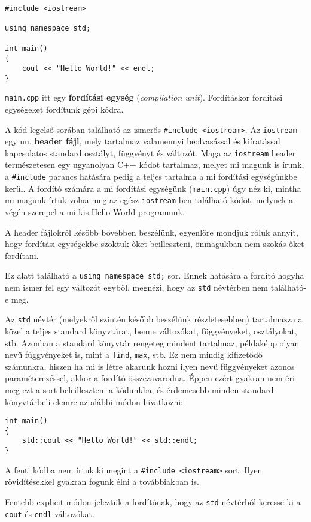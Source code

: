 \documentclass[a4paper,11.5pt,table]{article}
\begin{document}
	\medskip
	
	\begin{lstlisting}
#include <iostream>

using namespace std;
	
int main()
{
	cout << "Hello World!" << endl;
}
	\end{lstlisting}
	\texttt{main.cpp} itt egy \textbf{fordítási egység} (\textit{compilation unit}). Fordításkor fordítási egységeket fordítunk gépi kódra.
	
	A kód legelső sorában található az ismerős \texttt{\#include <iostream>}. Az \texttt{iostream} egy un. \textbf{header fájl}, mely tartalmaz valamennyi beolvasással és kiíratással kapcsolatos standard osztályt, függvényt és változót. Maga az \texttt{iostream} header természetesen egy ugyanolyan C++ kódot tartalmaz, melyet mi magunk is írunk, a \texttt{\#include} parancs hatására pedig a teljes tartalma a mi fordítási egységünkbe kerül. A fordító számára a mi fordítási egységünk (\texttt{main.cpp}) úgy néz ki, mintha mi magunk írtuk volna meg az egész \texttt{iostream}-ben található kódot, melynek a végén szerepel a mi kis Hello World programunk.
	
	A header fájlokról később bővebben beszélünk, egyenlőre mondjuk róluk annyit, hogy fordítási egységekbe szoktuk őket beilleszteni, önmagukban nem szokás őket fordítani.
	
	\medskip
	Ez alatt található a \texttt{using namespace std;} sor. Ennek hatására a fordító hogyha nem ismer fel egy változót egyből, megnézi, hogy az \texttt{std} névtérben nem található-e meg. 
	
	Az \texttt{std} névtér (melyekről szintén később beszélünk részletesebben) tartalmazza a közel a teljes standard könyvtárat, benne változókat, függvényeket, osztályokat, stb. Azonban a standard könyvtár rengeteg mindent tartalmaz, példaképp olyan nevű függvényeket is, mint a \texttt{find}, \texttt{max}, stb. Ez nem mindig kifizetődő számunkra, hiszen ha mi is létre akarunk hozni ilyen nevű függvényeket azonos paraméterezéssel, akkor a fordító összezavarodna. Éppen ezért gyakran nem éri meg ezt a sort beleilleszteni a kódunkba, és érdemesebb minden standard könyvtárbeli elemre az alábbi módon hivatkozni:
	\begin{lstlisting}
int main()
{
	std::cout << "Hello World!" << std::endl;
}
	\end{lstlisting}
	\begin{note}
		A fenti kódba nem írtuk ki megint a \texttt{\#include <iostream>} sort. Ilyen rövidítésekkel gyakran fogunk élni a továbbiakban is. 
	\end{note}
	Fentebb explicit módon jeleztük a fordítónak, hogy az \texttt{std} névtérból keresse ki a \texttt{cout} és \texttt{endl} változókat.
	
\end{document}
